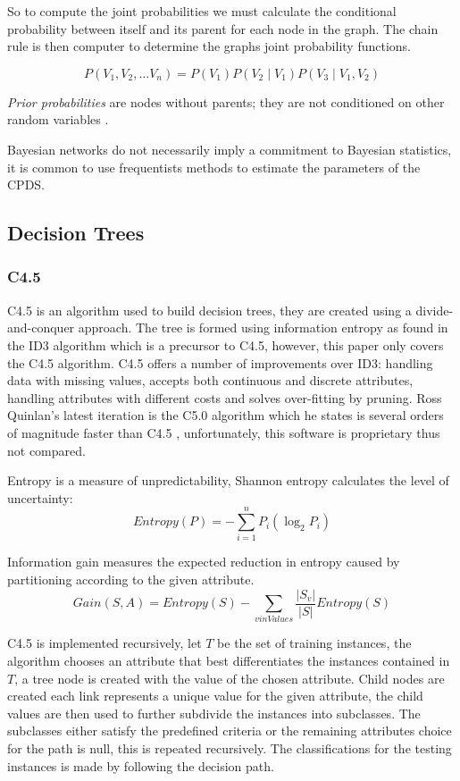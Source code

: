\documentclass{cmppgr}
\begin{document}
So to compute the joint probabilities we must calculate the conditional probability between itself and its parent for each node in the graph. The chain rule is then computer to determine the graphs joint probability functions. 

$$P(V_1, V_2, \dots V_n) = P(V_1)P(V_2 \mid V_1)P(V_3 \mid V_1, V_2)$$


\textit{Prior probabilities} are nodes without parents; they are not conditioned on other random variables \cite{jensen1996introduction}.


Bayesian networks do not necessarily imply a commitment to Bayesian statistics, it is common to use frequentists methods to estimate the parameters of the CPDS.


\subsection{Decision Trees}
\subsubsection{C4.5}
C4.5 is an algorithm used to build decision trees, they are created using a divide-and-conquer approach. The tree is formed using information entropy as found in the ID3 algorithm which is a precursor to C4.5, however, this paper only covers the C4.5 algorithm. C4.5 offers a number of improvements over ID3: handling data with missing values, accepts both continuous and discrete attributes, handling attributes with different costs and solves over-fitting by pruning. Ross Quinlan's latest iteration is the C5.0 algorithm which he states is several orders of magnitude faster than C4.5 \cite{quinlan2004data}, unfortunately, this software is proprietary thus not compared.

Entropy is a measure of unpredictability, Shannon entropy calculates the level of uncertainty:
$$Entropy(P) = -\sum_{i=1}^{n}P_i(\log_2P_i)$$

Information gain measures the expected reduction in entropy caused by partitioning according to the given attribute.
$$Gain(S,A)=Entropy(S)- \sum_{v in Values}^{}\frac{|S_v|}{|S|}Entropy(S)$$

C4.5 is implemented recursively, let $T$ be the set of training instances, the algorithm chooses an attribute that best differentiates the instances contained in $T$, a tree node is created with the value of the chosen attribute. Child nodes are created each link represents a unique value for the given attribute, the child values are then used to further subdivide the instances into subclasses. The subclasses either satisfy the predefined criteria or the remaining attributes choice for the path is null, this is repeated recursively. The classifications for the testing instances is made by following the decision path.
\end{document}

